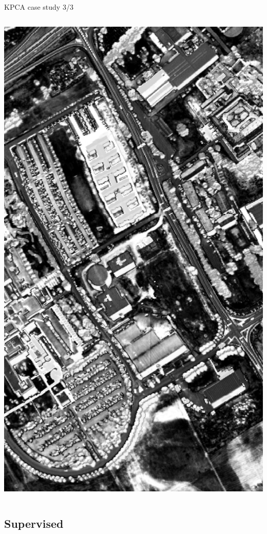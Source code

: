 \documentclass[10pt,aspectratio=1610]{beamer}
\begin{document}
\begin{frame}[fragile,label={sec:orga380b9d}]{KPCA case study 3/3}
\begin{columns}
\begin{column}{0.3\columnwidth}
\includegraphics[width=0.75\linewidth]{./figures/university_kpc3.png}
\end{column}
\end{columns}
\end{frame}

\subsection{Supervised}
\label{sec:org9c68c9a}
\end{document}

